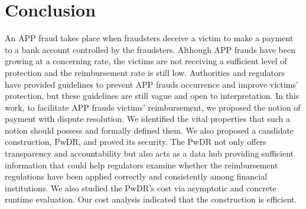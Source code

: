 

\section{Conclusion}\label{sec::conclusion}


An APP fraud takes place when fraudsters deceive a victim to make a payment to a bank account controlled by the fraudsters. Although APP frauds have been growing at a concerning rate, the victims are not receiving a sufficient level of protection and the reimbursement rate is still low. Authorities and regulators have  provided guidelines to prevent APP frauds occurrence and improve victims’ protection, but these guidelines are still vague and open to interpretation. In this work, to facilitate APP frauds victims’ reimbursement,  we proposed the notion of payment with dispute resolution. We identified the vital properties that such a notion should possess and formally defined them. We also proposed a candidate construction,  PwDR, and proved its security.  The PwDR not only offers transparency and accountability but also acts as a data hub providing sufficient information that could help regulators examine whether the reimbursement regulations have been applied correctly and consistently among financial institutions.  We also studied the PwDR's cost via asymptotic and concrete runtime evaluation. Our cost analysis indicated that the construction is efficient. 











